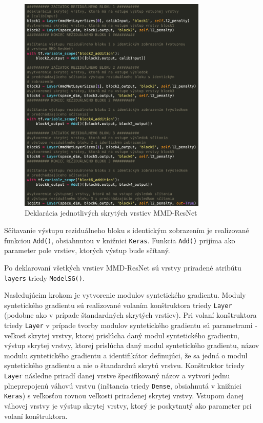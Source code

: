 \begin{figure}
\centerline{\includegraphics[width=0.8\textwidth]{images/kod.png}}
\caption[Deklarácia skrytých vrstiev MMD-ResNet]{Deklarácia jednotlivých skrytých vrstiev MMD-ResNet}
\label{kod_vrstvy}
\end{figure}

Sčítavanie výstupu reziduálneho bloku s identickým zobrazením je realizované funkciou \texttt{Add()}, obsiahnutou v knižnici \texttt{Keras}. Funkcia \texttt{Add()} prijíma ako parameter pole vrstiev, ktorých výstup bude sčítaný.

Po deklarovaní všetkých vrstiev MMD-ResNet sú vrstvy priradené atribútu \texttt{layers} triedy \texttt{ModelSG()}.

Nasledujúcim krokom je vytvorenie modulov syntetického gradientu. Moduly syntetického gradientu sú realizované volaním konštruktora triedy \texttt{Layer} (podobne ako v prípade štandardných skrytých vrstiev). Pri volaní konštruktora triedy \texttt{Layer} v prípade tvorby modulov syntetického gradientu sú parametrami - veľkosť skrytej vrstvy, ktorej prislúcha daný modul syntetického gradientu, výstup skrytej vrstvy, ktorej prislúcha daný modul syntetického gradientu, názov modulu syntetického gradientu a identifikátor definujúci, že sa jedná o modul syntetického gradientu a nie o štandardnú skrytú vrstvu. Konštruktor triedy \texttt{Layer} následne priradí danej vrstve špecifikovaný názov a vytvorí jednu plneprepojenú váhovú vrstvu (inštancia triedy \texttt{Dense}, obsiahnutá v knižnici \texttt{Keras}) s veľkosťou rovnou veľkosti priradenej skrytej vrstvy. Vstupom danej váhovej vrstvy je výstup skrytej vrstvy, ktorý je poskytnutý ako parameter pri volaní konštruktora. 

